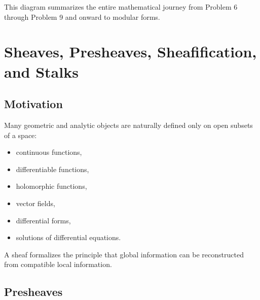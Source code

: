 \documentclass[12pt,a4paper]{article}
\theoremstyle{notespace}
\begin{document}
This diagram summarizes the entire mathematical journey from Problem 6 through Problem 9 and onward to modular forms.

	
\section{Sheaves, Presheaves, Sheafification, and Stalks}

\subsection{Motivation}

Many geometric and analytic objects are naturally defined only on open subsets of a space:

\begin{itemize}
	\item continuous functions,
	\item differentiable functions,
	\item holomorphic functions,
	\item vector fields,
	\item differential forms,
	\item solutions of differential equations.
\end{itemize}

A sheaf formalizes the principle that global information can be reconstructed from compatible local information.

\bigskip

\begin{center}
\end{center}

\subsection{Presheaves}
\end{document}
